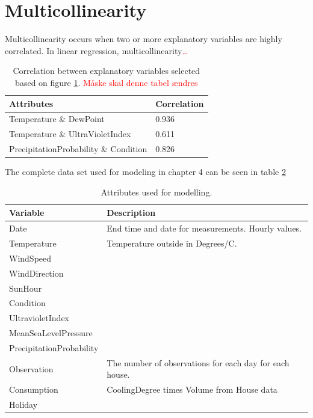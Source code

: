 \section{Multicollinearity}
Multicollinearity occurs when two or more explanatory variables are highly correlated. In linear regression, multicollinearity\textcolor{red}{\dots} 
\begin{table}
    \centering
    \begin{tabular}{ll}
     \hline
     \textbf{Attributes} & \textbf{Correlation}  \\
    \hline
    \hline
    Temperature \& DewPoint  &  0.936 \\
    Temperature \& UltraVioletIndex  & 0.611 \\
    PrecipitationProbability \& Condition & 0.826 \\
    \hline
    \end{tabular}
    \caption{Correlation between explanatory variables selected based on figure \ref{}. \textcolor{red}{Måske skal denne tabel ændres}}
    \label{tab: correlation_table}
\end{table}   
\noindent The complete data set used for modeling in chapter 4 can be seen in table \ref{tab: modeldata} 
\begin{table}
    \centering
    \begin{tabular}{ll}
     \hline
     \textbf{Variable} & \textbf{Description} \\
    \hline
    \hline
    Date  &  End time and date for measurements. Hourly values.\\
    Temperature  &  Temperature outside in Degrees/C. \\
    WindSpeed  &  \\
    WindDirection  &  \\
    SunHour  &  \\
    Condition  & \\
    UltravioletIndex  &   \\
    MeanSeaLevelPressure  & \\
    PrecipitationProbability & \\
    Observation & The number of observations for each day for each house.\\
    Consumption & CoolingDegree times Volume from House data \\
    Holiday & \\
    \hline
    \end{tabular}
    \caption{Attributes used for modelling.}
    \label{tab: modeldata}
\end{table}   